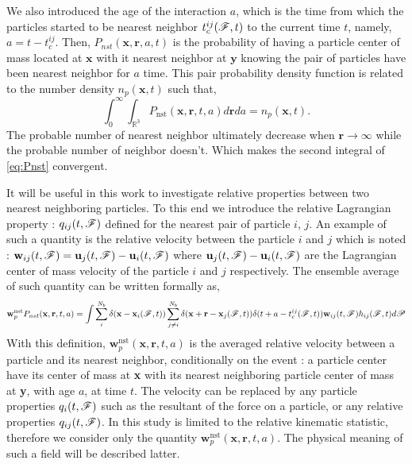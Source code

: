 We also introduced the age of the interaction $a$, which is the time from which the particles started to be nearest neighbor $t_c^{ij}(\mathscr{F},t)$ to the current time $t$, namely, $a = t - t^{ij}_c$. 
Then, $P_{nst}(\textbf{x},\textbf{r},a,t)$ is the probability of having a particle center of mass located at $\textbf{x}$ with it nearest neighbor at $\textbf{y}$ knowing the pair of particles have been nearest neighbor for $a$ time. 
This pair probability density function is related to the number density $n_p(\textbf{x},t)$ such that, 
\begin{equation*}
    \int_0^\infty 
    \int_{\mathbb{R}^3}
    P_\text{nst}(\textbf{x},\textbf{r},t,a) d\textbf{r} da = n_p(\textbf{x},t). 
    \label{eq:Pnst}
\end{equation*}
The probable number of nearest neighbor ultimately decrease when $\textbf{r}\to\infty$ while the probable number  of neighbor doesn't. 
Which makes the second integral of \ref{eq:Pnst} convergent. 


It will be useful in this work to investigate relative properties between two nearest neighboring particles. 
To this end we introduce the relative Lagrangian property : $q_{ij}(t,\mathscr{F})$ defined for the nearest pair of particle $i$, $j$. 
An example of such a quantity is the relative velocity between the particle $i$ and $j$ which is noted : $\textbf{w}_{ij}(t,\mathscr{F}) = \textbf{u}_j(t,\mathscr{F}) - \textbf{u}_i(t,\mathscr{F})$ where $\textbf{u}_j(t,\mathscr{F}) - \textbf{u}_i(t,\mathscr{F})$ are the Lagrangian center of mass velocity of the particle $i$ and $j$ respectively. 
The ensemble average of such quantity can be written formally as, 
\begin{equation*}
    \textbf{w}^\text{nst}_p P_{nst}(\textbf{x},\textbf{r},t,a)= 
    \int \sum_{i}^{N_b}\delta(\textbf{x}-\textbf{x}_i(\mathscr{F},t))
    \sum_{j\neq i}^{N_b}\delta(\textbf{x}+\textbf{r}-\textbf{x}_j(\mathscr{F},t)) 
    \delta(t+a-t_c^{ij}(\mathscr{F},t)) 
    \textbf{w}_{ij}(t,\mathscr{F})
    h_{ij}(\mathscr{F},t) 
    d\mathscr{P} 
    \label{eq:q_nstij}
\end{equation*}
With this definition, $\textbf{w}^\text{nst}_p(\textbf{x},\textbf{r},t,a)$ is the averaged relative velocity between a particle and its nearest neighbor, conditionally on the event : a particle center have its center of mass at \textbf{x} with its nearest neighboring particle center of mass at \textbf{y}, with age $a$, at time $t$. 
The velocity can be replaced by any particle properties $q_{i}(t,\mathscr{F})$ such as the resultant of the force on a particle, or any relative properties $q_{ij}(t,\mathscr{F})$. 
In this study is limited to the relative kinematic statistic, therefore we consider only the quantity $\textbf{w}^\text{nst}_p(\textbf{x},\textbf{r},t,a)$. 
The physical meaning of such a field will be described latter. 

